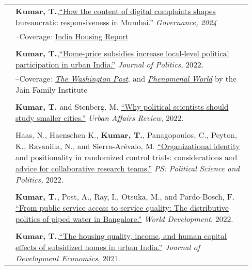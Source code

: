 \documentclass[letterpaper, 10.5pt]{article}
\begin{document}
\begin{longtable}{p{1.5in}p{5in}}
&\textbf{Kumar, T.},\href{https://onlinelibrary.wiley.com/doi/10.1111/gove.12889}{``How the content of digital complaints shapes bureaucratic responsiveness in Mumbai.''}   \textit{\textit{Governance}, 2024} \\
&--\indent Coverage: \href{https://indiahousingreport.in/outputs/opinion/how-the-content-of-demands-shapes-government-responsiveness-excerpts-from-a-discussion/}{India Housing Report}\\
& \\
& \textbf{Kumar, T.},\href{https://doi.org/10.1086/715605}{``Home-price subsidies increase local-level political participation in urban India.''} \textit{Journal of Politics}, 2022.\\
& --\indent Coverage: \href{https://www.washingtonpost.com/news/monkey-cage/wp/2019/01/31/heres-what-gavin-newsom-elizabeth-warren-and-microsoft-should-know-if-want-to-end-the-affordable-housing-crisis/?tid=sm_tw_cage}{\textit{The Washington Post}}, and \href{https://www.phenomenalworld.org/sources/original-and-forgery/}{\textit{Phenomenal World}} by the Jain Family Institute  \\
& \\
& \textbf{Kumar, T.} and Stenberg, M. \href{https://doi.org/10.1177/10780874221124610}{``Why political scientists should study smaller cities.''}  \textit{Urban Affairs Review}, 2022. \\
& \\

& Haas, N., Haenschen K., \textbf{Kumar, T.}, Panagopoulos, C., Peyton, K., Ravanilla, N., and Sierra-Ar\'{e}valo, M. \href{https://www.doi.org/10.1017/S1049096522000026}{``Organizational identity and positionality in randomized control trials: considerations and advice for collaborative research teams.''} \textit{PS: Political Science and Politics,} 2022. \\
& \\
& \textbf{Kumar, T.}, Post, A., Ray, I., Otsuka, M., and Pardo-Bosch, F. \href{https://doi.org/10.1016/j.worlddev.2021.105736}{``From public service access to service quality: The distributive politics of piped water in Bangalore.''} \textit{World Development}, 2022. \\

& \\

&\textbf{Kumar, T.},\href{https://doi.org/10.1016/j.jdeveco.2021.102738}{``The housing quality, income, and human capital effects of subsidized homes in urban India.''} \textit{Journal of Development Economics}, 2021.\\


\end{longtable}
\end{document}
